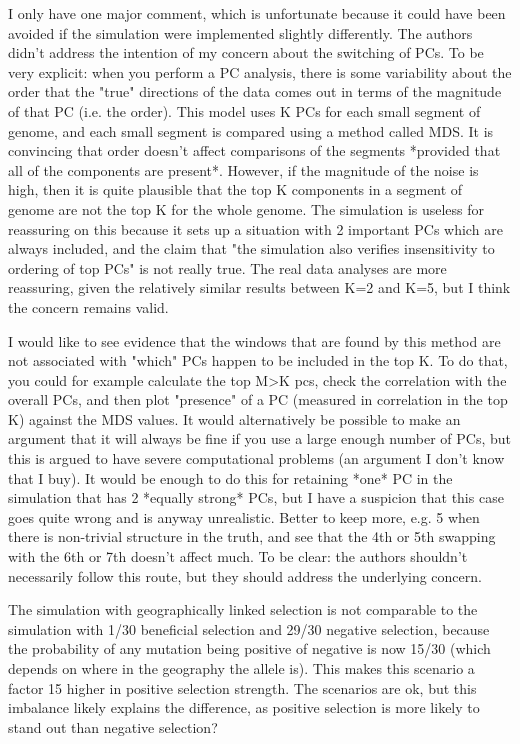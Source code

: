 \begin{point}{}
I only have one major comment, which is unfortunate because it could have been avoided if the simulation were implemented slightly differently. The authors didn't address the intention of my concern about the switching of PCs. To be very explicit: when you perform a PC analysis, there is some variability about the order that the "true" directions of the data comes out in terms of the magnitude of that PC (i.e. the order). This model uses K PCs for each small segment of genome, and each small segment is compared using a method called MDS. It is convincing that order doesn't affect comparisons of the segments *provided that all of the components are present*. However, if the magnitude of the noise is high, then it is quite plausible that the top K components in a segment of genome are not the top K for the whole genome. The simulation is useless for reassuring on this because it sets up a situation with 2 important PCs which are always included, and the claim that "the simulation also verifies insensitivity to ordering of top PCs" is not really true. The real data analyses are more reassuring, given the relatively similar results between K=2 and K=5, but I think the concern remains valid.

I would like to see evidence that the windows that are found by this method are not associated with "which" PCs happen to be included in the top K. To do that, you could for example calculate the top M>K pcs, check the correlation with the overall PCs, and then plot "presence" of a PC (measured in correlation in the top K) against the MDS values. It would alternatively be possible to make an argument that it will always be fine if you use a large enough number of PCs, but this is argued to have severe computational problems (an argument I don't know that I buy). It would be enough to do this for retaining *one* PC in the simulation that has 2 *equally strong* PCs, but I have a suspicion that this case goes quite wrong and is anyway unrealistic. Better to keep more, e.g. 5 when there is non-trivial structure in the truth, and see that the 4th or 5th swapping with the 6th or 7th doesn't affect much. To be clear: the authors shouldn't necessarily follow this route, but they should address the underlying concern.
\end{point}

\reply{
}

\begin{point}{}
The simulation with geographically linked selection is not comparable to the simulation with 1/30 beneficial selection and 29/30 negative selection, because the probability of any mutation being positive of negative is now 15/30 (which depends on where in the geography the allele is). This makes this scenario a factor 15 higher in positive selection strength. The scenarios are ok, but this imbalance likely explains the difference, as positive selection is more likely to stand out than negative selection? 
\end{point}

\reply{
}
